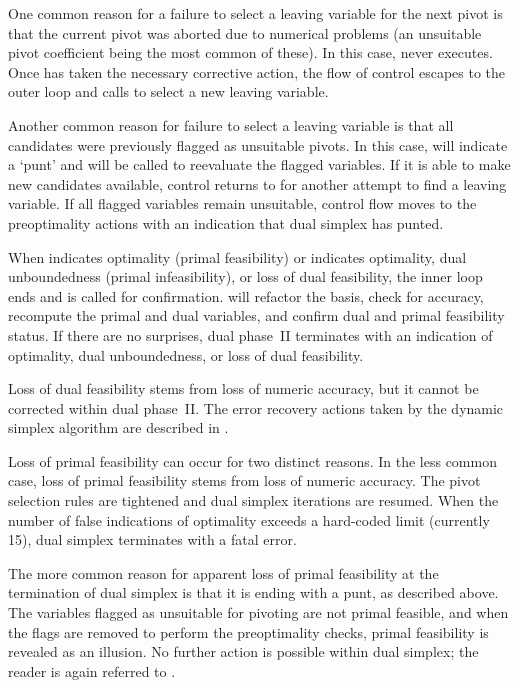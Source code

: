 One common reason for a failure to select a leaving variable for the next
pivot is that the current pivot was aborted due to numerical problems
(an unsuitable pivot coefficient being the most common of these).
In this case,  never executes.
Once  has taken the necessary corrective action, the flow
of control escapes to the outer loop and calls  to select
a new leaving variable.

Another common reason for failure to select a leaving variable is that all
candidates were previously flagged as unsuitable pivots.
In this case,  will indicate a `punt' and
 will be called to reevaluate the flagged variables.
If it is able to make new candidates available, control returns to
 for another attempt to find a leaving variable.
If all flagged variables remain unsuitable, control flow moves to the
preoptimality actions with an indication that dual simplex has punted.

When  indicates optimality (primal feasibility) or
 indicates optimality, dual unboundedness (primal
infeasibility), or loss of dual feasibility,
the inner loop ends and  is called for confirmation.
 will refactor the basis, check for accuracy, recompute
the primal and dual variables, and confirm dual and primal feasibility status.
If there are no surprises, dual phase~II terminates with an indication of
optimality, dual unboundedness, or loss of dual feasibility.

Loss of dual feasibility stems from loss of numeric accuracy, but it cannot
be corrected within dual phase~II.
The error recovery actions taken by the dynamic simplex algorithm are described
in .

Loss of primal feasibility can occur for two distinct reasons.
In the less common case, loss of primal feasibility stems from loss of numeric
accuracy.
The pivot selection rules are tightened and dual simplex iterations
are resumed.
When the number of false indications of optimality exceeds a hard-coded limit
(currently 15), dual simplex terminates with a fatal error.

The more common reason for apparent loss of primal feasibility at the
termination of dual simplex is that it is ending with a punt, as
described above.
The variables flagged as unsuitable for pivoting are not primal feasible, and
when the flags are removed to perform the preoptimality checks, primal
feasibility is revealed as an illusion.
No further action is possible within dual simplex; the reader is again referred
to .

